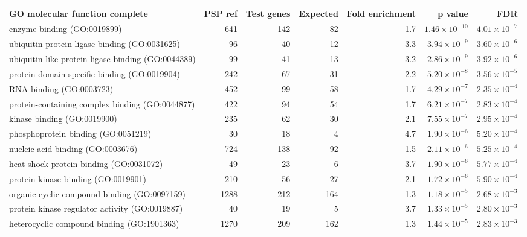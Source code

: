 \begin{table}[ht]
\centering
\begin{adjustbox}{width=\textwidth}

\begin{tabular}{lrrrrrr}
  \hline
GO molecular function complete & PSP ref & Test genes & Expected & Fold enrichment & p value & FDR \\ 
  \hline
enzyme binding (GO:0019899) & 641 & 142 & 82 & 1.7 & $1.46 \times 10^{-10}$ & $4.01 \times 10^{-7}$ \\ 
  ubiquitin protein ligase binding (GO:0031625) & 96 & 40 & 12 & 3.3 & $3.94 \times 10^{-9}$ & $3.60 \times 10^{-6}$ \\ 
  ubiquitin-like protein ligase binding (GO:0044389) & 99 & 41 & 13 & 3.2 & $2.86 \times 10^{-9}$ & $3.92 \times 10^{-6}$ \\ 
  protein domain specific binding (GO:0019904) & 242 & 67 & 31 & 2.2 & $5.20 \times 10^{-8}$ & $3.56 \times 10^{-5}$ \\ 
  RNA binding (GO:0003723) & 452 & 99 & 58 & 1.7 & $4.29 \times 10^{-7}$ & $2.35 \times 10^{-4}$ \\ 
  protein-containing complex binding (GO:0044877) & 422 & 94 & 54 & 1.7 & $6.21 \times 10^{-7}$ & $2.83 \times 10^{-4}$ \\ 
  kinase binding (GO:0019900) & 235 & 62 & 30 & 2.1 & $7.55 \times 10^{-7}$ & $2.95 \times 10^{-4}$ \\ 
  phosphoprotein binding (GO:0051219) & 30 & 18 & 4 & 4.7 & $1.90 \times 10^{-6}$ & $5.20 \times 10^{-4}$ \\ 
  nucleic acid binding (GO:0003676) & 724 & 138 & 92 & 1.5 & $2.11 \times 10^{-6}$ & $5.25 \times 10^{-4}$ \\ 
  heat shock protein binding (GO:0031072) & 49 & 23 & 6 & 3.7 & $1.90 \times 10^{-6}$ & $5.77 \times 10^{-4}$ \\ 
  protein kinase binding (GO:0019901) & 210 & 56 & 27 & 2.1 & $1.72 \times 10^{-6}$ & $5.90 \times 10^{-4}$ \\ 
  organic cyclic compound binding (GO:0097159) & 1288 & 212 & 164 & 1.3 & $1.18 \times 10^{-5}$ & $2.68 \times 10^{-3}$ \\ 
  protein kinase regulator activity (GO:0019887) & 40 & 19 & 5 & 3.7 & $1.33 \times 10^{-5}$ & $2.80 \times 10^{-3}$ \\ 
  heterocyclic compound binding (GO:1901363) & 1270 & 209 & 162 & 1.3 & $1.44 \times 10^{-5}$ & $2.83 \times 10^{-3}$ \\ 

\end{tabular}
\end{adjustbox}
\end{table}
